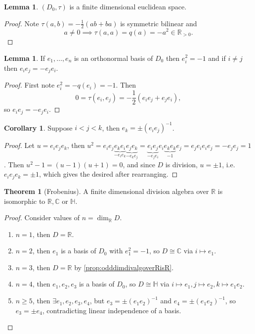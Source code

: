 \documentclass[a4paper]{article}
\newcommand{\R}{\mathbb{R}}
\newcommand{\C}{\mathbb{C}}
\newcommand{\Hq}{\mathbb{H}}
\theoremstyle{definition}
\newtheorem{thm}[defn]{Theorem}
\newtheorem{lemma}[defn]{Lemma}
\newtheorem{coro}[defn]{Corollary}
\begin{document}
\begin{lemma}
$(D_0,\tau)$ is a finite dimensional euclidean space.
\end{lemma}
\begin{proof}
Note $\tau(a,b)=-\frac12(ab+ba)$ is symmetric bilinear and
\[
a\neq 0\implies \tau(a,a)=q(a)=-a^2\in\R_{>0}.
\]
\end{proof}

\begin{lemma}
If $e_1,\ldots,e_n$ is an orthonormal basis of $D_0$ then $e_i^2=-1$ and if $i\neq j$ then $e_ie_j=-e_je_i$.
\end{lemma}
\begin{proof}
First note $e_i^2=-q(e_i)=-1$. Then
\[
0=\tau(e_i,e_j)=-\frac12(e_ie_j+e_je_i),
\]
so $e_ie_j=-e_je_i$.
\end{proof}

\begin{coro}
Suppose $i<j<k$, then $e_k=\pm (e_ie_j)^{-1}$.
\end{coro}
\begin{proof}
Let $u=e_ie_je_k$, then $u^2=e_ie_j\underbrace{e_ke_i}_{-e_ie_k}\underbrace{e_je_k}_{-e_ke_j}=\underbrace{e_ie_j}_{-e_je_i}e_i\underbrace{e_ke_k}_{-1}e_j=e_je_ie_ie_j=-e_je_j=1$. Then $u^2-1=(u-1)(u+1)=0$, and since $D$ is division, $u=\pm 1$, i.e. $e_ie_je_k=\pm 1$, which gives the desired after rearranging.
\end{proof}

\begin{thm}[Frobenius]
\label{thm:frobenius}
A finite dimensional division algebra over $\R$ is isomorphic to $\R,\C$ or $\Hq$.
\end{thm}
\begin{proof}
Consider values of $n=\dim_\R D$.
\begin{enumerate}
\item $n=1$, then $D=\R$.
\item $n=2$, then $e_1$ is a basis of $D_0$ with $e_1^2=-1$, so $D\cong\C$ via $i\mapsto e_1$.
\item $n=3$, then $D=\R$ by \ref{prop:odddimdivalgoverRisR}.
\item $n=4$, then $e_1,e_2,e_3$ is a basis of $D_0$, so $D\cong\Hq$ via $i\mapsto e_1,j\mapsto e_2,k\mapsto e_1e_2$.
\item $n\geq 5$, then $\exists e_1,e_2,e_3,e_4$, but $e_3=\pm(e_1e_2)^{-1}$ and $e_4=\pm(e_1e_2)^{-1}$, so $e_3=\pm e_4$, contradicting linear independence of a basis.
\end{enumerate}
\end{proof}
\end{document}
